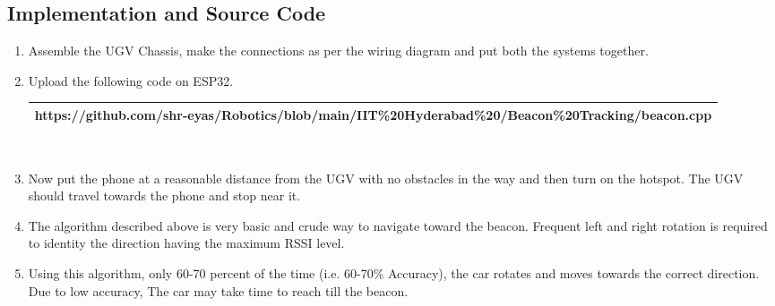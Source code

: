 \documentclass[journal,10pt]{article}
\begin{document}
\subsection{Implementation and Source Code}
\vspace{10pt}
\begin{enumerate}[label=\alph*.,labelindent=\parindent,leftmargin=*]

    \item Assemble the UGV Chassis, make the connections as per the wiring diagram and put both the systems together.
    
    \item Upload the following code on ESP32. \vspace{10pt} \\
    \begin{tabularx}{0.9\textwidth} { 
    | >{\centering\arraybackslash}X |}
    \hline
    https://github.com/shr-eyas/Robotics/blob/main/IIT\%20Hyderabad\%20/Beacon\%20Tracking/beacon.cpp\\
    \hline
    \end{tabularx} \\

    \item Now put the phone at a reasonable distance from the UGV with no obstacles in the way and then turn on the hotspot. The UGV should travel towards the phone and stop near it.

    \item The algorithm described above is very basic and crude way to navigate toward the beacon. Frequent left and right rotation is required to identity the direction having the maximum RSSI level.

    \item Using this algorithm, only 60-70 percent of the time (i.e. 60-70\% Accuracy), the car rotates and moves towards the correct direction. Due to low accuracy, The car may take time to reach till the beacon.
\end{enumerate}
\end{document}
